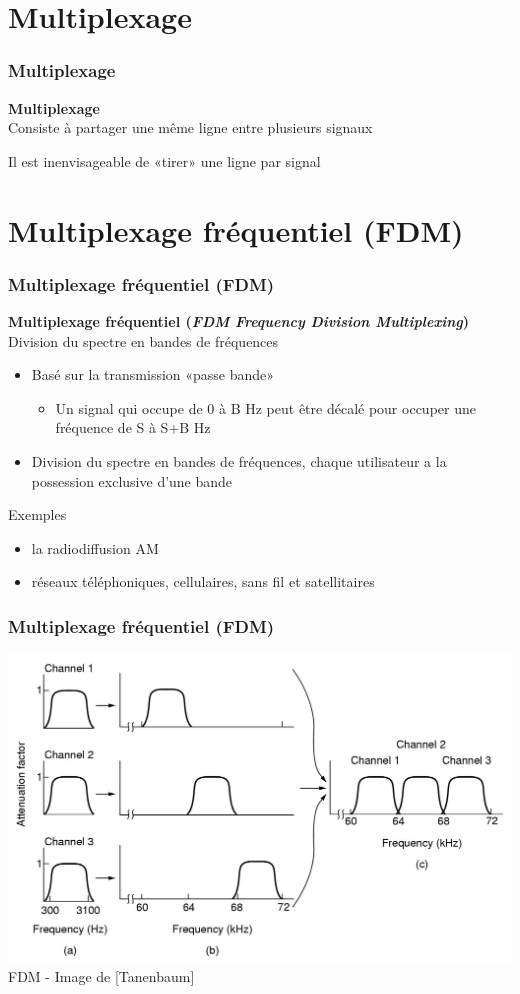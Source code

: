\section{Multiplexage}

\begin{frame}[fragile]
  \frametitle{Multiplexage}
{\bf\large  Multiplexage}\\
Consiste à partager une même ligne entre plusieurs signaux
\par Il est inenvisageable de «tirer» une ligne par signal
\end{frame}


\section{Multiplexage fréquentiel (FDM)}

\begin{frame}[fragile]
  \frametitle{Multiplexage fréquentiel (FDM)}
{\bf\large Multiplexage fréquentiel 
(\textit{FDM Frequency Division Multiplexing})}\\
Division du spectre en bandes de fréquences
\begin{itemize}
	\item Basé sur la transmission «passe bande»
	\begin{itemize}
		\item Un signal qui occupe de 0 à B Hz peut être décalé pour occuper une
		fréquence de S à S+B Hz
	\end{itemize}
	\item Division du spectre en bandes de fréquences, chaque utilisateur a la
	possession exclusive d'une bande
\end{itemize}
\vspace{1cm}
Exemples
\begin{itemize}
	\item la radiodiffusion AM
	\item réseaux téléphoniques, cellulaires, sans fil et satellitaires
\end{itemize}
\end{frame}

\begin{frame}[fragile]
  \frametitle{Multiplexage fréquentiel (FDM)}
\begin{center}
	\includegraphics[width=.7\linewidth]{img/2-24.jpg}\\
	{\scriptsize FDM - Image de [Tanenbaum]}
\end{center}
\end{frame}


